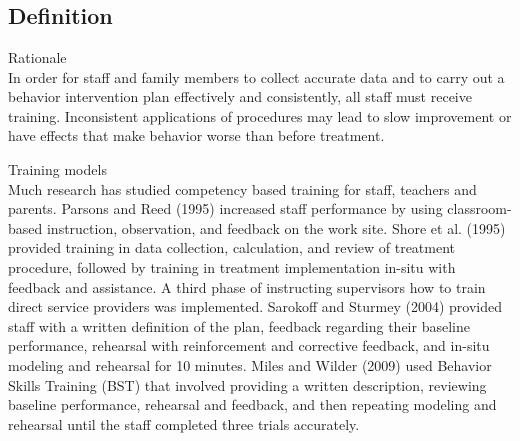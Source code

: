 \clearpage \section[\fourkThree{}]{\fourkThree{}%
              }
\subsection{Definition}
Rationale\\
In order for staff and family members to collect accurate data and to carry out a behavior intervention plan effectively and consistently, all staff must receive training.  Inconsistent applications of procedures may lead to slow improvement or have effects that make behavior worse than before treatment.  

Training models\\
Much research has studied competency based training for staff, teachers and parents. Parsons and Reed (1995) increased staff performance by using classroom-based instruction, observation, and feedback on the work site.  Shore et al. (1995) provided training in data collection, calculation, and review of treatment procedure, followed by training in treatment implementation in-situ with feedback and assistance.  A third phase of instructing supervisors how to train direct service providers was implemented.  Sarokoff and Sturmey (2004) provided staff with a written definition of the plan, feedback regarding their baseline performance, rehearsal with reinforcement and corrective feedback, and in-situ modeling and rehearsal for 10 minutes.  Miles and Wilder (2009) used Behavior Skills Training (BST) that involved providing a written description, reviewing baseline performance, rehearsal and feedback, and then repeating modeling and rehearsal until the staff completed three trials accurately.

